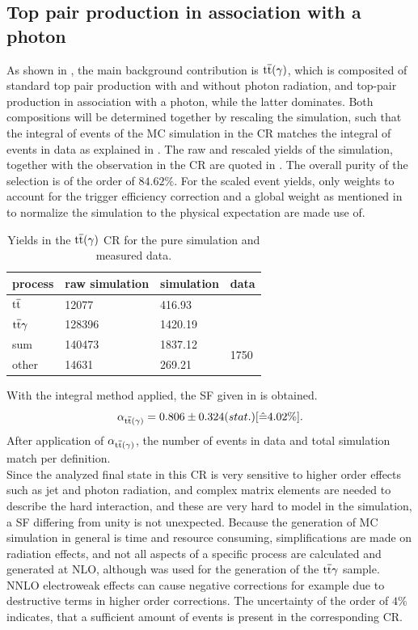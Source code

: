 \subsection{Top pair production in association with a photon}\label{sec:ttbar}
As shown in , the main background contribution is ${\mathrm{t}\overline{\mathrm{t}}}(\gamma)$, which is composited of standard top pair production with and without photon radiation, and top-pair production in association with a photon, while the latter dominates. Both compositions will be determined together by rescaling the simulation, such that the integral of events of the MC simulation in the CR matches the integral of events in data as explained in . The raw and rescaled yields of the simulation, together with the observation in the CR are quoted in . The overall purity of the selection is of the order of $84.62\%$. For the scaled event yields, only weights to account for the trigger efficiency correction and a global weight as mentioned in  to normalize the simulation to the physical expectation are made use of.
\begin{table}[tbp]
 \centering
 \caption{Yields in the ${\mathrm{t}\overline{\mathrm{t}}}(\gamma)$ CR for the pure simulation and measured data.}
 \label{tab:CRTT}
 \begin{tabular}{llll}
  
  process      & raw simulation & simulation & data                  \\\hline
  ${\mathrm{t}\overline{\mathrm{t}}}$     & 12077          & 416.93     &                       \\
  ${\mathrm{t}\overline{\mathrm{t}}}\gamma$ & 128396         & 1420.19    &                       \\\hline\hline
  sum          & 140473         & 1837.12    & \multirow{2}{*}{1750} \\
  other        & 14631          & 269.21     &                       
 \end{tabular}
\end{table}
With the integral method applied, the SF given in  is obtained.
\begin{equation}\label{eq:AlphaTT}
 \alpha_{{\mathrm{t}\overline{\mathrm{t}}}(\gamma)}=0.806 \pm 0.324 (stat.) [\hat{=}4.02\%].
\end{equation}
After application of $\alpha_{{\mathrm{t}\overline{\mathrm{t}}}(\gamma)}$, the number of events in data and total simulation match per definition.\\
Since the analyzed final state in this CR is very sensitive to higher order effects such as jet and photon radiation, and complex matrix elements are needed to describe the hard interaction, and these are very hard to model in the simulation, a SF differing from unity is not unexpected. Because the generation of MC simulation in general is time and resource consuming, simplifications are made on \eg radiation effects, and not all aspects of a specific process are calculated and generated at NLO, although \MCATNLO was used for the generation of the ${\mathrm{t}\overline{\mathrm{t}}}\gamma$ sample. NNLO electroweak effects can cause negative corrections for example due to destructive terms in higher order corrections. The uncertainty of the order of $4\%$ indicates, that a sufficient amount of events is present in the corresponding CR.\\
